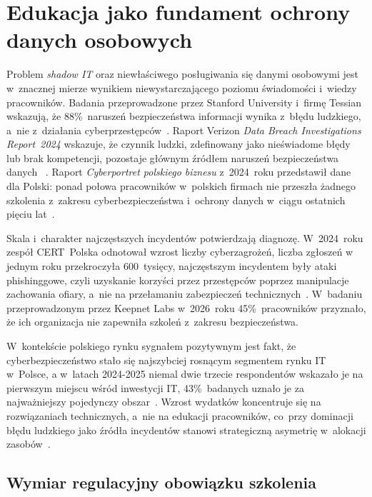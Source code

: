 \section{Edukacja jako fundament ochrony danych osobowych}

Problem \textit{shadow IT} oraz niewłaściwego posługiwania się danymi osobowymi jest w~znacznej mierze wynikiem niewystarczającego poziomu świadomości i~wiedzy pracowników.
Badania przeprowadzone przez Stanford University i~firmę Tessian wskazują, że 88\%~naruszeń bezpieczeństwa informacji wynika z~błędu ludzkiego, a~nie
z~działania cyberprzestępców~\autocite{isoqar_blad_ludzki}. Raport Verizon \textit{Data Breach Investigations Report~2024} wskazuje,
że czynnik ludzki, zdefinowany jako  nieświadome błędy lub brak kompetencji, pozostaje głównym źródłem naruszeń bezpieczeństwa danych ~\autocite{verizon_dbir_2024}.
Raport \textit{Cyberportret polskiego biznesu} z~2024~roku przedstawił dane dla Polski: ponad połowa pracowników w~polskich firmach nie przeszła żadnego
szkolenia z~zakresu cyberbezpieczeństwa i~ochrony danych w~ciągu ostatnich pięciu lat~\autocite{brandsit_szkolenia_2025}.

Skala i~charakter najczęstszych incydentów potwierdzają diagnozę. W~2024~roku zespół CERT~Polska odnotował wzrost liczby cyberzagrożeń, liczba zgłoszeń w jednym roku przekroczyła 600~tysięcy, najczęstszym incydentem były ataki phishinggowe, czyli uzyskanie korzyści przez przestępców poprzez manipulacje zachowania ofiary, a~nie na przełamaniu
zabezpieczeń technicznych~\autocite{cert_polska_2024}. W~badaniu przeprowadzonym przez Keepnet Labs w~2026~roku 45\%~pracowników przyznało, że ich
organizacja nie zapewniła szkoleń z~zakresu bezpieczeństwa\autocite{keepnet_2026}.

W~kontekście polskiego rynku sygnałem pozytywnym jest fakt, że cyberbezpieczeństwo stało się najszybciej rosnącym segmentem rynku IT w~Polsce, a w~latach 2024-2025 
niemal dwie trzecie respondentów wskazało je na pierwszym miejscu wśród inwestycji IT, 43\%~badanych uznało je za najważniejszy pojedynczy obszar~\autocite{pap_cyberbezpieczenstwo_2026}. Wzrost wydatków koncentruje się na rozwiązaniach technicznych, a~nie na edukacji pracowników, co~przy dominacji błędu ludzkiego jako źródła incydentów stanowi strategiczną asymetrię w~alokacji zasobów~\autocite{brandsit_szkolenia_2025}.

\subsection*{Wymiar regulacyjny obowiązku szkolenia}

